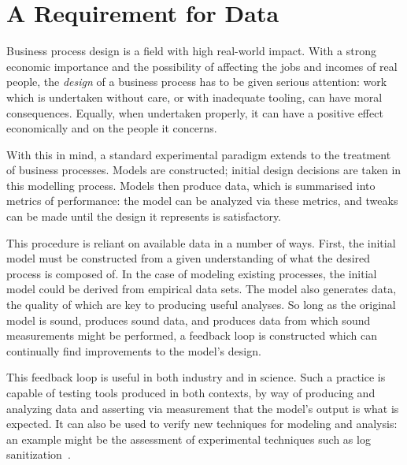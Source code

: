 \documentclass[draft,12pt]{llncs}  %
\begin{document}
\maketitle


\section{A Requirement for Data}
\label{sec:intro}


Business process design is a field with high real-world impact. With a strong
economic importance and the possibility of affecting the jobs and incomes of
real people, the \emph{design} of a business process has to be given serious
attention: work which is undertaken without care, or with inadequate tooling,
can have moral consequences. Equally, when undertaken properly, it can have a
positive effect economically and on the people it concerns.
\par

With this in mind, a standard experimental paradigm extends to the treatment of
business processes. Models are constructed; initial design decisions are
taken in this modelling process. Models then produce data, which is summarised
into metrics of performance: the model can be analyzed via these metrics, and
tweaks can be made until the design it represents is satisfactory.
\par


This procedure is reliant on available data in a number of ways. First, the
initial model must be constructed from a given understanding of what the desired
process is composed of. In the case of modeling existing processes,
the initial model could be derived from empirical data sets. The model also
generates data, the quality of which are key to producing useful analyses. So
long as the original model is sound, produces sound data, and produces data from
which sound measurements might be performed, a feedback loop is constructed
which can continually find improvements to the model's design. \par

This feedback loop is useful in both industry and in science. Such a practice is
capable of testing tools produced in both contexts, by way of producing and
analyzing data and asserting via measurement that the model's output is what is
expected. It can also be used to verify new techniques for modeling and
analysis: an example might be the assessment of experimental techniques such as
log sanitization~\citep{cheng2015process}.
\par
\end{document}
